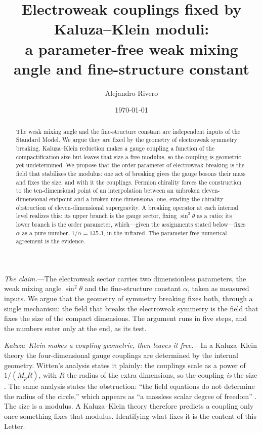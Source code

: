\documentclass[aps,prl,reprint,superscriptaddress,nofootinbib]{revtex4-2}
\begin{document}
\title{Electroweak couplings fixed by Kaluza--Klein moduli:\\
a parameter-free weak mixing angle and fine-structure constant}

\author{Alejandro Rivero}

\date{\today}

\begin{abstract}
The weak mixing angle and the fine-structure constant are independent inputs of
the Standard Model. We argue they are fixed by the geometry of electroweak
symmetry breaking. Kaluza--Klein reduction makes a gauge coupling a function of
the compactification size but leaves that size a free modulus, so the coupling
is geometric yet undetermined. We propose that the order parameter of
electroweak breaking is the field that stabilizes the modulus: one act of
breaking gives the gauge bosons their mass and fixes the size, and with it the
couplings. Fermion chirality forces the construction to the ten-dimensional
point of an interpolation between an unbroken eleven-dimensional endpoint and a
broken nine-dimensional one, evading the chirality obstruction of
eleven-dimensional supergravity. A breaking operator at each internal level
realizes this: its upper branch is the gauge sector, fixing $\sin^2\theta$ as a
ratio; its lower branch is the order parameter, which---given the assignments stated
below---fixes $\alpha$ as a pure number, $1/\alpha=135.3$, in the infrared. The parameter-free numerical
agreement is the evidence.
\end{abstract}

\maketitle

\textit{The claim.}---The electroweak sector carries two dimensionless
parameters, the weak mixing angle $\sin^2\theta$ and the fine-structure constant
$\alpha$, taken as measured inputs. We argue that the geometry of symmetry
breaking fixes both, through a single mechanism: the field that breaks the
electroweak symmetry is the field that fixes the size of the compact dimensions. The argument runs in five steps, and the
numbers enter only at the end, as its test.

\textit{Kaluza--Klein makes a coupling geometric, then leaves it free.}---In a
Kaluza--Klein theory the four-dimensional gauge couplings are determined by the
internal geometry. Witten's analysis states it plainly: the couplings scale as a
power of $1/(M_pR)$, with $R$ the radius of the extra dimensions, so the coupling
\emph{is} the size \cite{WittenKK1981}. The same analysis states the obstruction:
``the field equations do not determine the radius of the circle,'' which appears
as ``a massless scalar degree of freedom'' \cite{WittenKK1981}. The size is a
modulus. A Kaluza--Klein theory therefore predicts a coupling only once something
fixes that modulus. Identifying what fixes it is the content of this Letter.
\end{document}

